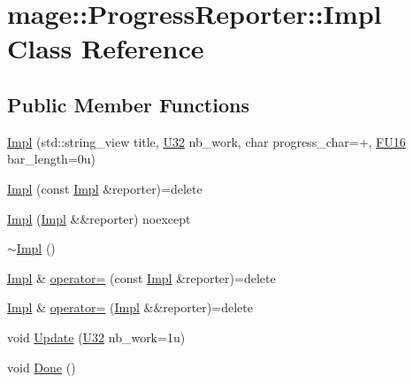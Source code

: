 \hypertarget{classmage_1_1_progress_reporter_1_1_impl}{}\section{mage\+:\+:Progress\+Reporter\+:\+:Impl Class Reference}
\label{classmage_1_1_progress_reporter_1_1_impl}
\subsection*{Public Member Functions}
\begin{DoxyCompactItemize}
\item 
\mbox{\hyperlink{classmage_1_1_progress_reporter_1_1_impl_affc0da330c4cbf2e47ca8359383e4b16}{Impl}} (std\+::string\+\_\+view title, \mbox{\hyperlink{namespacemage_aa5d6eaabaac3cdd01873d6a3d27e90f3}{U32}} nb\+\_\+work, char progress\+\_\+char=\textquotesingle{}+\textquotesingle{}, \mbox{\hyperlink{namespacemage_a4888c2a93673ffcfc3195e561dfdd893}{F\+U16}} bar\+\_\+length=0u)
\item 
\mbox{\hyperlink{classmage_1_1_progress_reporter_1_1_impl_af721b271934a492c3a47d8920d76c3c8}{Impl}} (const \mbox{\hyperlink{classmage_1_1_progress_reporter_1_1_impl}{Impl}} \&reporter)=delete
\item 
\mbox{\hyperlink{classmage_1_1_progress_reporter_1_1_impl_ab3b6811ed80a087ac10c90e97730147c}{Impl}} (\mbox{\hyperlink{classmage_1_1_progress_reporter_1_1_impl}{Impl}} \&\&reporter) noexcept
\item 
\mbox{\hyperlink{classmage_1_1_progress_reporter_1_1_impl_af5dbbaa059fdfc22e90e274ba14053a8}{$\sim$\+Impl}} ()
\item 
\mbox{\hyperlink{classmage_1_1_progress_reporter_1_1_impl}{Impl}} \& \mbox{\hyperlink{classmage_1_1_progress_reporter_1_1_impl_a18d90c9b1c400d83d8c3a1ba54b23d69}{operator=}} (const \mbox{\hyperlink{classmage_1_1_progress_reporter_1_1_impl}{Impl}} \&reporter)=delete
\item 
\mbox{\hyperlink{classmage_1_1_progress_reporter_1_1_impl}{Impl}} \& \mbox{\hyperlink{classmage_1_1_progress_reporter_1_1_impl_a39801a31c5265467a8056f2bb125cf39}{operator=}} (\mbox{\hyperlink{classmage_1_1_progress_reporter_1_1_impl}{Impl}} \&\&reporter)=delete
\item 
void \mbox{\hyperlink{classmage_1_1_progress_reporter_1_1_impl_a89d8090c7280c12a046c03df8dc7d7b3}{Update}} (\mbox{\hyperlink{namespacemage_aa5d6eaabaac3cdd01873d6a3d27e90f3}{U32}} nb\+\_\+work=1u)
\item 
void \mbox{\hyperlink{classmage_1_1_progress_reporter_1_1_impl_a58a0fb3d0e5f164fc36ad7416bb98d2d}{Done}} ()
\end{DoxyCompactItemize}
